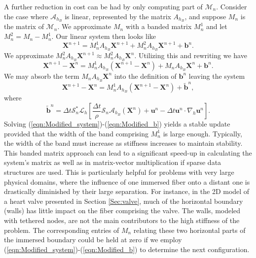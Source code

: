 \documentclass[preprint,12pt]{elsarticle}
\begin{document}
A further reduction in cost can be had by only computing part of $\mathcal{M}_n$. Consider the case where $\mathcal{A}_{h_B}$ is linear, represented by the matrix $A_{h_B}$, and suppose $M_n$ is the matrix of $\mathcal{M}_n$. We approximate $M_n$ with a banded matrix $M_n^1$ and let $M_n^2 = M_n - M_n^1$. 
Our linear system then looks like
\begin{equation}
\mathbf{X}^{n+1} = M_n^1 A_{h_B} \mathbf{X}^{n+1}
+ M_n^2 A_{h_B} \mathbf{X}^{n+1} + \mathbf{b}^n.
\end{equation}
We approximate $M_n^2 A_{h_B} \mathbf{X}^{n+1} \approx M_n^2 A_{h_B} \mathbf{X}^n$. Utilizing this and rewriting we have
\begin{equation}
\mathbf{X}^{n+1} - \mathbf{X}^n = M_n^1 A_{h_B} (\mathbf{X}^{n+1} - \mathbf{X}^n)
+ M_n A_{h_B} \mathbf{X}^{n} + \mathbf{b}^n.
\end{equation}
We may absorb the term $M_n A_{h_B} \mathbf{X}^{n}$ into the definition of $\mathbf{b}^n$ leaving the system
\begin{equation}
\mathbf{X}^{n+1}-\mathbf{X}^n = M_n^1 A_{h_B} (\mathbf{X}^{n+1}-\mathbf{X}^n) + \mathbf{\tilde{b}}^n,
\label{eqn:Modified_system}
\end{equation}
where 
\begin{equation}
\mathbf{\tilde{b}}^n=\Delta t\mathcal{S}^*_n\mathcal{L}_h
\left[\frac{\Delta t}{\rho} \mathcal{S}_n\mathcal{A}_{h_B}(\mathbf{X}^n) + \mathbf{u}^n - \Delta t\mathbf{u}^n \cdot \nabla_h \mathbf{u}^n \right].
\label{eqn:Modified_b}
\end{equation}
Solving  (\ref{eqn:Modified_system})-(\ref{eqn:Modified_b}) yields a stable update 
provided that the width of the band comprising $M_n^1$ is large enough.
Typically, the width of the band must increase as stiffness increases to maintain stability. This  banded matrix approach can lead to a significant speed-up in calculating the system's matrix as well as in matrix-vector multiplication if sparse data structures are used. This is particularly helpful for problems with very large physical domains, where the influence of one immersed fiber onto 
a distant one is drastically diminished by their large separation. For instance, in the 2D model of a heart valve presented in
Section \ref{Sec:valve},  much of the horizontal boundary (walls)  has little impact
on  the fiber comprising the valve. The walls, modeled with tethered nodes, are not the main contributors to the high stiffness of the
problem. The corresponding entries of $M_n$ relating these two horizontal parts of the immersed boundary could be held at zero if we employ (\ref{eqn:Modified_system})-(\ref{eqn:Modified_b}) to determine the next configuration.
\end{document}
